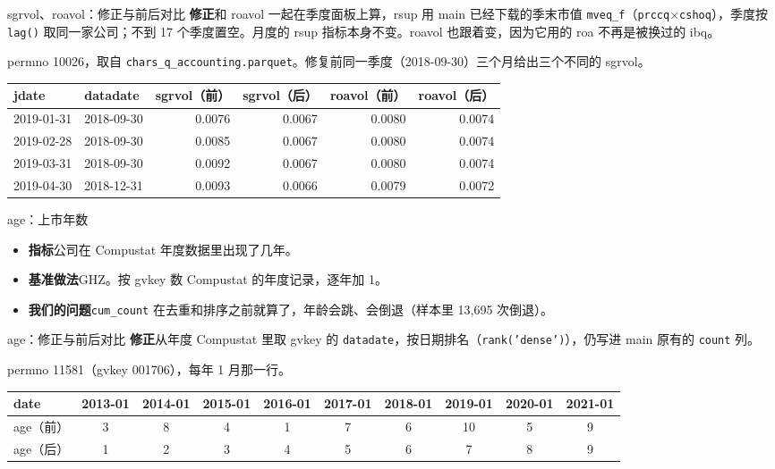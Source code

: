 \documentclass[UTF8,fontset=fandol,aspectratio=169,10pt,t]{ctexbeamer}
\newcommand{\chg}[1]{\textcolor{red!80!black}{#1}}
\newcommand{\code}[1]{\texttt{#1}}
\newcommand{\lab}[1]{\textbf{#1}\quad}
\newcommand{\src}[1]{{\footnotesize\color{black!60}#1}}
\begin{document}
\begin{frame}{sgrvol、roavol：修正与前后对比}
\lab{修正}和 roavol 一起在季度面板上算，rsup 用 main 已经下载的季末市值 \code{mveq\_f}（\code{prccq}$\times$\code{cshoq}），季度按 \code{lag()} 取同一家公司；不到 17 个季度置空。月度的 rsup 指标本身不变。roavol 也跟着变，因为它用的 roa 不再是被换过的 ibq。\par\medskip
\src{permno 10026，取自 \code{chars\_q\_accounting.parquet}。修复前同一季度（2018-09-30）三个月给出三个不同的 sgrvol。}\par\smallskip
{\footnotesize\setlength{\tabcolsep}{4.5pt}
\begin{tabular}{l l rr rr}
\toprule
jdate & datadate & sgrvol（前） & sgrvol（后） & roavol（前） & roavol（后） \\
\midrule
2019-01-31 & 2018-09-30 & 0.0076 & \chg{0.0067} & 0.0080 & \chg{0.0074} \\
2019-02-28 & 2018-09-30 & 0.0085 & \chg{0.0067} & 0.0080 & \chg{0.0074} \\
2019-03-31 & 2018-09-30 & 0.0092 & \chg{0.0067} & 0.0080 & \chg{0.0074} \\
2019-04-30 & 2018-12-31 & 0.0093 & \chg{0.0066} & 0.0079 & \chg{0.0072} \\
\bottomrule
\end{tabular}}
\end{frame}

\begin{frame}{age：上市年数}
\begin{itemize}
\item \lab{指标}公司在 Compustat 年度数据里出现了几年。
\item \lab{基准做法}GHZ。按 gvkey 数 Compustat 的年度记录，逐年加 1。
\item \lab{我们的问题}\code{cum\_count} 在去重和排序之前就算了，年龄会跳、会倒退（样本里 13,695 次倒退）。
\end{itemize}
\end{frame}

\begin{frame}{age：修正与前后对比}
\lab{修正}从年度 Compustat 里取 gvkey 的 \code{datadate}，按日期排名（\code{rank('dense')}），仍写进 main 原有的 \code{count} 列。\par\medskip
\src{permno 11581（gvkey 001706），每年 1 月那一行。}\par\smallskip
{\footnotesize\setlength{\tabcolsep}{4pt}
\begin{tabular}{l *{9}{c}}
\toprule
date & 2013-01 & 2014-01 & 2015-01 & 2016-01 & 2017-01 & 2018-01 & 2019-01 & 2020-01 & 2021-01 \\
\midrule
age（前） & 3 & 8 & 4 & 1 & 7 & 6 & 10 & 5 & 9 \\
age（后） & \chg{1} & \chg{2} & \chg{3} & \chg{4} & \chg{5} & 6 & \chg{7} & \chg{8} & 9 \\
\bottomrule
\end{tabular}}
\end{frame}
\end{document}
